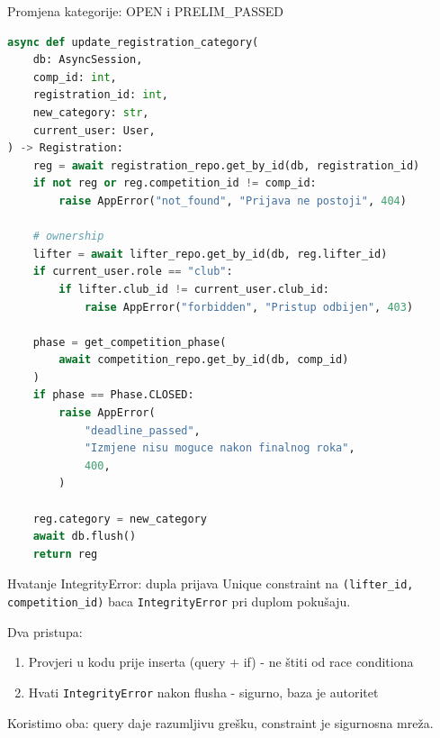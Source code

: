 \begin{frame}[fragile,shrink=5]{Promjena kategorije: OPEN i PRELIM\_PASSED}
\begin{lstlisting}[language=python]
async def update_registration_category(
    db: AsyncSession,
    comp_id: int,
    registration_id: int,
    new_category: str,
    current_user: User,
) -> Registration:
    reg = await registration_repo.get_by_id(db, registration_id)
    if not reg or reg.competition_id != comp_id:
        raise AppError("not_found", "Prijava ne postoji", 404)

    # ownership
    lifter = await lifter_repo.get_by_id(db, reg.lifter_id)
    if current_user.role == "club":
        if lifter.club_id != current_user.club_id:
            raise AppError("forbidden", "Pristup odbijen", 403)

    phase = get_competition_phase(
        await competition_repo.get_by_id(db, comp_id)
    )
    if phase == Phase.CLOSED:
        raise AppError(
            "deadline_passed",
            "Izmjene nisu moguce nakon finalnog roka",
            400,
        )

    reg.category = new_category
    await db.flush()
    return reg
\end{lstlisting}
\end{frame}

\begin{frame}{Hvatanje IntegrityError: dupla prijava}
Unique constraint na \texttt{(lifter\_id, competition\_id)} baca \texttt{IntegrityError} pri duplom pokušaju.

\vspace{0.6em}
Dva pristupa:
\begin{enumerate}
  \item Provjeri u kodu prije inserta (query + if) - ne štiti od race conditiona
  \item Hvati \texttt{IntegrityError} nakon flusha - sigurno, baza je autoritet
\end{enumerate}

\vspace{0.6em}
Koristimo oba: query daje razumljivu grešku, constraint je sigurnosna mreža.
\end{frame}

